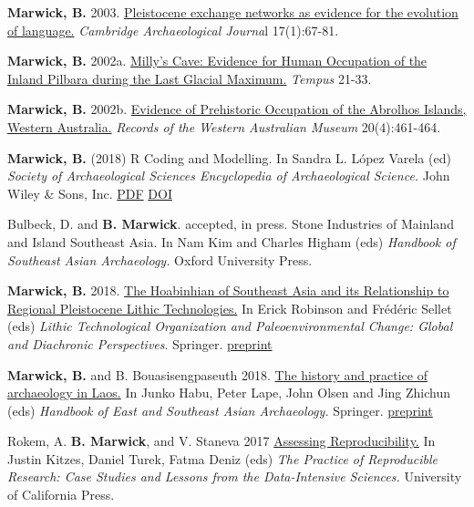 \documentclass[11pt,article,oneside]{memoir}
\begin{document}
{{{{\ind \textbf{Marwick, B.} 2003. \href{http://faculty.washington.edu/bmarwick/PDFs/Marwick_2003_CAJ.pdf}{Pleistocene exchange networks as evidence for the evolution of language.} \textit{Cambridge Archaeological Journa}l 17(1):67-81.

\ind \textbf{Marwick, B.} 2002a. \href{http://faculty.washington.edu/bmarwick/PDFs/Marwick_2002_Tempus.pdf}{Milly's Cave: Evidence for Human Occupation of the Inland Pilbara during the Last Glacial Maximum.} \textit{Tempus} 21-33.

\ind \textbf{Marwick, B.} 2002b. \href{http://faculty.washington.edu/bmarwick/PDFs/Marwick_2002_RWAM.pdf}{Evidence of Prehistoric Occupation of the Abrolhos Islands, Western Australia.} \textit{Records of the Western Australian Museum} 20(4):461-464.

\bigskip


\ind \textbf{Marwick, B.} (2018) R Coding and Modelling. In Sandra L. López Varela (ed) \textit{Society of Archaeological Sciences Encyclopedia of Archaeological Science.}  John Wiley & Sons, Inc. \href{http://faculty.washington.edu/bmarwick/PDFs/Marwick-2018-R-Coding-and-Modeling-The-Encyclopedia-of-Archaeological-Sciences.pdf}{PDF} \href{https://doi.org/10.1002/9781119188230.saseas0631}{DOI}

\ind Bulbeck, D. and \textbf{B. Marwick}. accepted, in press. Stone Industries of Mainland and Island Southeast Asia. In Nam Kim and Charles Higham (eds) \textit{Handbook of Southeast Asian Archaeology.} Oxford University Press.

\ind \textbf{Marwick, B.} 2018. \href{https://doi.org/10.1007/978-3-319-64407-3_4}{The Hoabinhian of Southeast Asia and its Relationship to Regional Pleistocene Lithic Technologies.} In Erick Robinson and Frédéric Sellet (eds) \textit{Lithic Technological Organization and Paleoenvironmental Change: Global and Diachronic Perspectives}. Springer. \href{https://doi.org/10.17605/OSF.IO/9PT8G}{preprint}

\ind \textbf{Marwick, B.} and B. Bouasisengpaseuth 2018. \href{https://doi.org/10.1007/978-1-4939-6521-2_8}{The history and practice of archaeology in Laos.} In Junko Habu, Peter Lape, John Olsen and Jing Zhichun (eds) \textit{ Handbook of East and Southeast Asian Archaeology.} Springer. \href{https://dx.doi.org/10.17605/OSF.IO/75ZHC}{preprint}

\ind Rokem, A. \textbf{B. Marwick}, and V. Staneva 2017 \href{https://www.practicereproducibleresearch.org/core-chapters/2-assessment.html}{Assessing Reproducibility.} In Justin Kitzes, Daniel Turek, Fatma Deniz (eds) \textit{The Practice of Reproducible Research: Case Studies and Lessons from the Data-Intensive Sciences.} University of California Press.

}}}}
\end{document}
